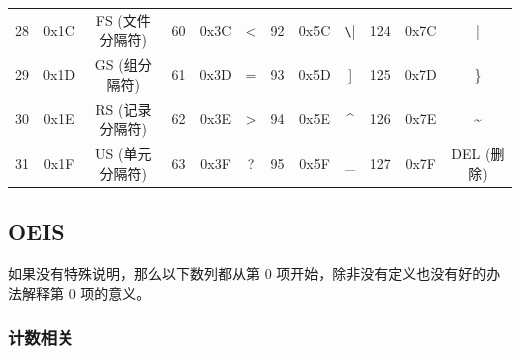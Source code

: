 \documentclass[a4paper, twoside]{article}
\begin{document}
\begin{table}[h]
\begin{tabular}{|c c c|c c c|c c c|c c c|}
            28  & 0x1C & FS (文件分隔符)   & 60  & 0x3C & <          & 92  & 0x5C & \verb|\|    & 124  & 0x7C & |            \\
            29  & 0x1D & GS (组分隔符)     & 61  & 0x3D & =          & 93  & 0x5D & ]           & 125  & 0x7D & \}           \\
            30  & 0x1E & RS (记录分隔符)   & 62  & 0x3E & >          & 94  & 0x5E & \^{}        & 126  & 0x7E & \~{}         \\
            31  & 0x1F & US (单元分隔符)   & 63  & 0x3F & ?          & 95  & 0x5F & \_          & 127  & 0x7F & DEL (删除)    \\
            \hline
        \end{tabular}
    \end{table}
    

    \newpage
    \subsection{OEIS}
    \label{OEIS}

    如果没有特殊说明，那么以下数列都从第 $0$ 项开始，除非没有定义也没有好的办法解释第 $0$ 项的意义。

    \subsubsection{计数相关}
\end{document}
